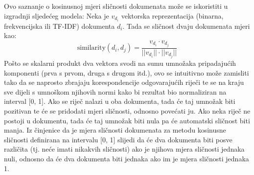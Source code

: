 \documentclass[times, utf8, zavrsni, numeric]{fer}
\begin{document}
Ovo saznanje o kosinusnoj mjeri sličnosti dokumenata može se iskoristiti u izgradnji sljedećeg modela: Neka je $v_{d_i}$ vektorska reprezentacija (binarna, frekvencijska ili TF-IDF) dokumenta $d_{i}$. Tada se sličnost dvaju dokumenata mjeri kao:
\begin{equation}
{\displaystyle {\text{similarity}}(d_{i}, d_{j})}={\frac{v_{d_i} \cdot v_{d_j}}{||v_{d_i}|| \cdot ||v_{d_j}||}}
\end{equation}
Pošto se skalarni produkt dva vektora svodi na sumu umnožaka pripadajućih komponenti (prva s prvom, druga s drugom itd.), ovo se intuitivno može zamisliti tako da se naprosto zbrajaju korespondencije odgovarajućih riječi te se na kraju sve dijeli s umnoškom njihovih normi kako bi rezultat bio normaliziran na interval [0, 1]. Ako se riječ nalazi u oba dokumenta, tada će taj umnožak biti pozitivan te će se pridodati mjeri sličnosti, odnosno povećati ju. Ako neka riječ ne postoji u dokumentu, tada će taj umnožak biti nula pa će automatski sličnost biti manja. Iz činjenice da je mjera sličnosti dokumenata za metodu kosinusne sličnosti definirana na intervalu [0, 1] slijedi da će dva dokumenta biti posve različita (tj. neće imati nikakvih sličnosti) ako je njihova mjera sličnosti jednaka nuli, odnosno da će dva dokumenta biti jednaka ako im je mjera sličnosti jednaka 1.
\end{document}
